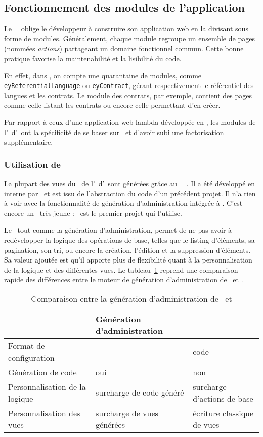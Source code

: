 \subsection{Fonctionnement des modules de l'application}
\label{section:eyrolles_modules}

Le \afm\ \asf\ oblige le développeur à construire son application web en la divisant sous forme de modules. Généralement, chaque module regroupe un ensemble de pages (nommées \emph{actions}) partageant un domaine fonctionnel commun. Cette bonne pratique favorise la maintenabilité et la lisibilité du code.

En effet, dans \aey, on compte une quarantaine de modules, comme \texttt{ey\-Referential\-Language} ou \texttt{eyContract}, gérant respectivement le ré\-fé\-ren\-ti\-el des langues et les contrats. Le module des contrats, par exemple, contient des pages comme celle listant les contrats ou encore celle permettant d'en créer.

Par rapport à ceux d'une application web lambda développée en \asf, les modules de l'\aintranet\ d'\aey\ ont la spécificité de se baser sur \asladmin\ et d'avoir subi une factorisation supplémentaire.


\subsubsection{Utilisation de \asladmin}

La plupart des vues du \alotdeux\ de l'\aintranet\ d'\aey\ sont générées grâce au \aplugin\ \asf\ \asladmin. Il a été développé en interne par \asl\ et est issu de l'abstraction du code d'un précédent projet. Il n'a rien à voir avec la fonctionnalité de génération d'administration intégrée à \asf. C'est encore un \aplugin\ très jeune : \aey\ est le premier projet qui l'utilise.

Le \aplugin\, tout comme la génération d'administration, permet de ne pas avoir à redévelopper la logique des opérations de base, telles que le listing d'éléments, sa pagination, son tri, ou encore la création, l'édition et la suppression d'éléments. Sa valeur ajoutée est qu'il apporte plus de flexibilité quant à la personnalisation de la logique et des différentes vues. Le tableau~\ref{table:eyrolles_sladmin_sladmin-vs-admin-gen} reprend une comparaison rapide des différences entre le moteur de génération d'administration de \asf\ et \asladmin.

\begin{table}
	\centering
	\begin{tabular}{|p{3cm}||p{4.5cm}|p{4.5cm}|}
		\hline
		& Génération d'administration & \asladmin\ \tabularnewline
		\hline
		\hline
		Format de configuration & \ayml & code \aphp \tabularnewline
		\hline
		Génération de code & oui & non \tabularnewline
		\hline
		Personnalisation de la logique & surcharge de code généré & surcharge d'actions de base \tabularnewline
		\hline
		Personnalisation des vues & surcharge de vues générées & écriture classique de vues \tabularnewline
		\hline
	\end{tabular}
	\caption{Comparaison entre la génération d'administration de \asf\ et \asladmin}
	\label{table:eyrolles_sladmin_sladmin-vs-admin-gen}
\end{table}

